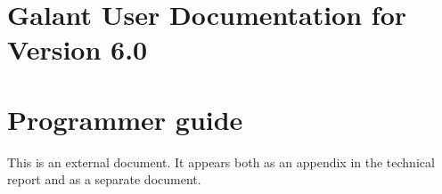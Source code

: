 \documentclass{article}
\begin{document}

\renewcommand{\VERSION}{6.0}

\section{Galant User Documentation for Version \VERSION}



\section{Programmer guide} \label{sec:programmer_guide}

This is an external document.
It appears both as an appendix in the technical report and as
a separate document.



\end{document}
